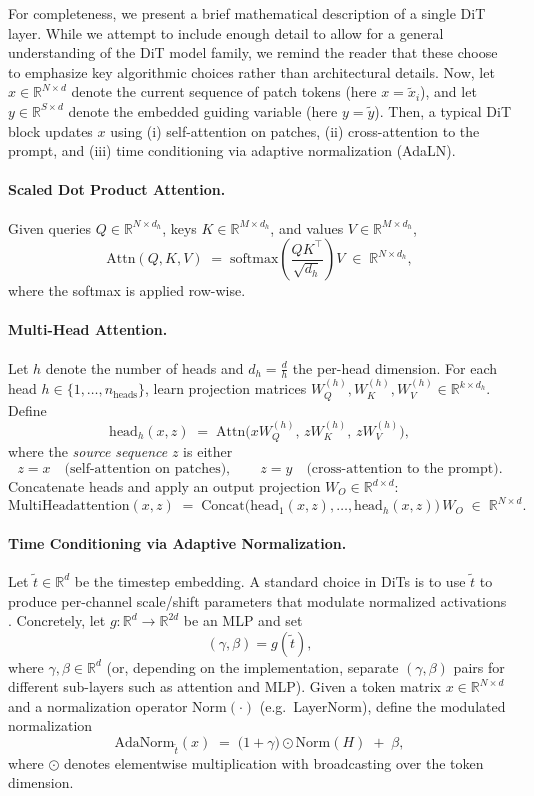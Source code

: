 \begin{remarkbox}
\label{remark:dit_layer}
For completeness, we present a brief mathematical description of a single DiT layer. While we attempt to include enough detail to allow for a general understanding of the DiT model family, we remind the reader that these choose to emphasize key algorithmic choices rather than architectural details. Now, let $x\in\mathbb{R}^{N\times d}$ denote the current sequence of patch tokens (here $x=\tilde x_i$),
and let $y\in\mathbb{R}^{S \times d}$ denote the embedded guiding variable (here $y=\tilde y$).
Then, a typical DiT block updates $x$ using (i) self-attention on patches, (ii) cross-attention to the prompt,
and (iii) time conditioning via adaptive normalization (AdaLN).

\paragraph{Scaled Dot Product Attention.}
Given queries $Q\in\mathbb{R}^{N\times d_h}$, keys $K\in\mathbb{R}^{M\times d_h}$, and values $V\in\mathbb{R}^{M\times d_h}$,
\[
\mathrm{Attn}(Q,K,V)
\;=\;
\mathrm{softmax}\!\left(\frac{QK^\top}{\sqrt{d_h}}\right)V
\;\in\;\mathbb{R}^{N\times d_h},
\]
where the softmax is applied row-wise.

\paragraph{Multi-Head Attention.}
Let $h$ denote the number of heads and $d_h=\frac{d}{h}$ the per-head dimension.
For each head $h\in\{1,\dots,n_{\text{heads}}\}$, learn projection matrices
$W_Q^{(h)},W_K^{(h)},W_V^{(h)}\in\mathbb{R}^{k\times d_h}$.
Define
\[
\text{head}_h(x,z)
\;=\;
\mathrm{Attn}\!\big(xW_Q^{(h)},\,zW_K^{(h)},\,zW_V^{(h)}\big),
\]
where the \emph{source sequence} $z$ is either
\[
z=x \quad \text{(self-attention on patches)},\qquad
z=y \quad \text{(cross-attention to the prompt)}.
\]
Concatenate heads and apply an output projection $W_O\in\mathbb{R}^{d\times d}$:
\[
\mathrm{MultiHeadattention}(x,z)
\;=\;
\mathrm{Concat}\big(\text{head}_1(x,z),\dots,\text{head}_{h}(x,z)\big)\,W_O
\;\in\;\mathbb{R}^{N\times d}.
\]

\paragraph{Time Conditioning via Adaptive Normalization.}
Let $\tilde t\in\mathbb{R}^d$ be the timestep embedding. A standard choice in DiTs is to use $\tilde t$
to produce per-channel scale/shift parameters that modulate normalized activations \citep{perez2018film}.
Concretely, let $g:\mathbb{R}^d\to\mathbb{R}^{2d}$ be an MLP and set
\[
(\gamma,\beta) = g(\tilde t),
\]
where $\gamma,\beta\in\mathbb{R}^{d}$ (or, depending on the implementation, separate $(\gamma,\beta)$ pairs for different
sub-layers such as attention and MLP). Given a token matrix $x\in\mathbb{R}^{N\times d}$ and a normalization operator
$\mathrm{Norm}(\cdot)$ (e.g.\ LayerNorm), define the modulated normalization
\[
\mathrm{AdaNorm}_{\tilde t}(x)
\;=\;
\bigl(1+\gamma\bigr)\odot \mathrm{Norm}(H) \;+\; \beta,
\]
where $\odot$ denotes elementwise multiplication with broadcasting over the token dimension.


\end{remarkbox}
